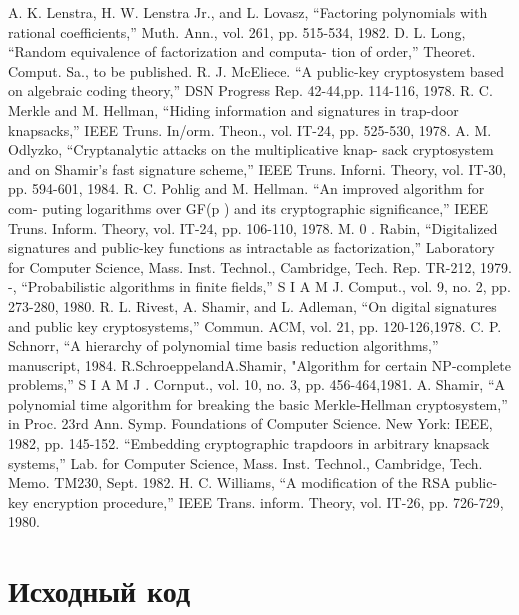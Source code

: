 \documentclass[a4paper,12pt]{article}
\begin{document}
\begin{thebibliography}{9}
A. K. Lenstra, H. W. Lenstra Jr., and L. Lovasz, “Factoring polynomials with rational coefficients,” Muth. Ann., vol. 261, pp. 515-534, 1982.
D. L. Long, “Random equivalence of factorization and computa- tion of order,” Theoret. Comput. Sa., to be published.
R. J. McEliece. “A public-key cryptosystem based on algebraic coding theory,” DSN Progress Rep. 42-44,pp. 114-116, 1978.
R. C. Merkle and M. Hellman, “Hiding information and signatures in trap-door knapsacks,” IEEE Truns. In/orm. Theon., vol. IT-24, pp. 525-530, 1978.
A. M. Odlyzko, “Cryptanalytic attacks on the multiplicative knap- sack cryptosystem and on Shamir’s fast signature scheme,” IEEE Truns. Inforni. Theory, vol. IT-30, pp. 594-601, 1984.
R. C. Pohlig and M. Hellman. “An improved algorithm for com- puting logarithms over GF(p ) and its cryptographic significance,” IEEE Truns. Inform. Theory, vol. IT-24, pp. 106-110, 1978.
M. 0 . Rabin, “Digitalized signatures and public-key functions as intractable as factorization,” Laboratory for Computer Science, Mass. Inst. Technol., Cambridge, Tech. Rep. TR-212, 1979.
-, “Probabilistic algorithms in finite fields,” S I A M J. Comput., vol. 9, no. 2, pp. 273-280, 1980.
R. L. Rivest, A. Shamir, and L. Adleman, “On digital signatures and public key cryptosystems,” Commun. ACM, vol. 21, pp. 120-126,1978.
C. P. Schnorr, “A hierarchy of polynomial time basis reduction algorithms,” manuscript, 1984.
R.SchroeppelandA.Shamir, "Algorithm for certain NP-complete problems,” S I A M J . Cornput., vol.
10, no. 3, pp. 456-464,1981.
A. Shamir, “A polynomial time algorithm for breaking the basic
Merkle-Hellman cryptosystem,” in Proc. 23rd Ann. Symp. Foundations of Computer Science. New York: IEEE, 1982, pp. 145-152.
“Embedding cryptographic trapdoors in arbitrary knapsack systems,” Lab. for Computer Science, Mass. Inst. Technol., Cambridge, Tech. Memo. TM230, Sept. 1982.
H. C. Williams, “A modification of the RSA public-key encryption procedure,” IEEE Trans. inform. Theory, vol. IT-26, pp. 726-729, 1980.
\end{thebibliography}

\newpage

\section{Исходный код}
\end{document}
